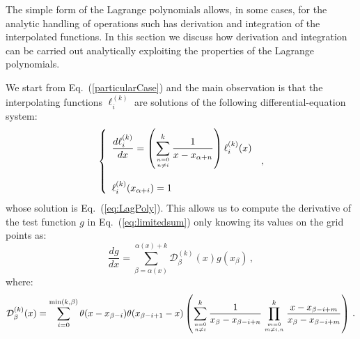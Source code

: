 \documentclass[10pt,a4paper]{article}
\begin{document}
The simple form of the Lagrange polynomials allows, in some cases, for
the analytic handling of operations such has derivation and
integration of the interpolated functions. In this section we discuss
how derivation and integration can be carried out analytically
exploiting the properties of the Lagrange polynomials.

We start from Eq.~(\ref{particularCase}) and the main observation is
that the interpolating functions $\ell_i^{(k)}$ are solutions of the
following differential-equation system:
\begin{equation}\label{eq:diffeqlagpol}
\left\{
\begin{array}{l}
\displaystyle \frac{d\ell_i^{(k)}}{dx} = \left(\sum_{n=0 \atop n\neq
  i}^k\frac{1}{x-x_{\alpha+n}}\right) \ell_i^{(k)}(x)\\
\\
\ell_i^{(k)}(x_{\alpha+i}) = 1
\end{array}
\right.\,,
\end{equation}
whose solution is Eq.~(\ref{eq:LagPoly}). This allows us to compute the
derivative of the test function $g$ in Eq.~(\ref{eq:limitedsum}) only
knowing its values on the grid points as: 
\begin{equation}\label{DerGeneralCase2}
  \frac{dg}{dx} =
  \sum_{\beta=\alpha(x)}^{\alpha(x)+k}\mathcal{D}_\beta^{(k)}(x) g(x_{\beta})\,,
\end{equation}
where:
\begin{equation}\label{eq:derintfunc}
  \mathcal{D}_\beta^{(k)}(x) = \sum_{i=0}^{{\rm min}(k,\beta)}
  \theta(x-x_{\beta-i})\theta(x_{\beta-i+1}-x) \left(\sum_{n=0 \atop n\neq
  i}^k\frac1{x_\beta-x_{\beta-i+n}}\prod^{k}_{m=0\atop m\ne
    i,n}\frac{x-x_{\beta-i+m}}{x_{\beta}-x_{\beta-i+m}}\right)\,.
\end{equation}
\end{document}
